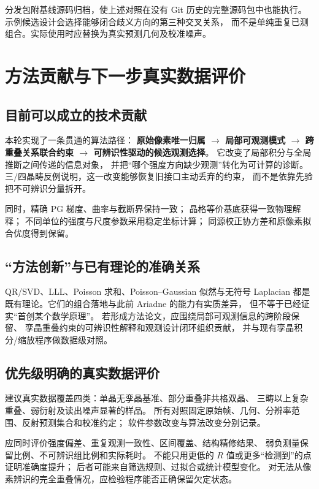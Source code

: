 \documentclass[UTF8,11pt,a4paper,fontset=fandol]{ctexart}
\begin{document}
分发包附基线源码归档，使上述对照在没有 Git 历史的完整源码包中也能执行。
示例候选设计会选择能够闭合歧义方向的第三种交叉关系，
而不是单纯重复已测组合。实际使用时应替换为真实预测几何及校准噪声。

\section{方法贡献与下一步真实数据评价}

\subsection{目前可以成立的技术贡献}

本轮实现了一条贯通的算法路径：
\textbf{原始像素唯一归属 $\rightarrow$ 局部可观测模式
$\rightarrow$ 跨重叠关系联合约束 $\rightarrow$ 可辨识性驱动的候选观测选择}。
它改变了局部积分与全局推断之间传递的信息对象，
并把“哪个强度方向缺少观测”转化为可计算的诊断。
三/四晶畴反例说明，这一改变能够恢复旧接口主动丢弃的约束，
而不是依靠先验把不可辨识分量拆开。

同时，精确 PG 梯度、曲率与截断界保持一致；
晶格等价基底获得一致物理解释；
不同单位的强度与尺度参数采用稳定坐标计算；
同源校正协方差和原像素拟合优度得到保留。

\subsection{“方法创新”与已有理论的准确关系}

QR/SVD、LLL、Poisson 求和、Poisson--Gaussian 似然与无符号 Laplacian
都是既有理论。它们的组合落地与此前 Ariadne 的能力有实质差异，
但不等于已经证实“首创某个数学原理”。
若形成方法论文，应围绕局部可观测信息的跨阶段保留、
孪晶重叠约束的可辨识性解释和观测设计闭环组织贡献，
并与现有孪晶积分/缩放程序做数据级对照。

\subsection{优先级明确的真实数据评价}

建议真实数据覆盖四类：单晶无孪晶基准、部分重叠非共格双晶、
三畴以上复杂重叠、弱衍射及读出噪声显著的样品。
所有对照固定原始帧、几何、分辨率范围、反射预测集合和校准约定；
软件参数改变与算法改变分别记录。

应同时评价强度偏差、重复观测一致性、区间覆盖、结构精修结果、
弱负测量保留比例、不可辨识组比例和实际耗时。
不能只用更低的 $R$ 值或更多“检测到”的点证明准确度提升；
后者可能来自筛选规则、过拟合或统计模型变化。
对无法从像素辨识的完全重叠情况，应检验程序能否正确保留欠定状态。
\end{document}
